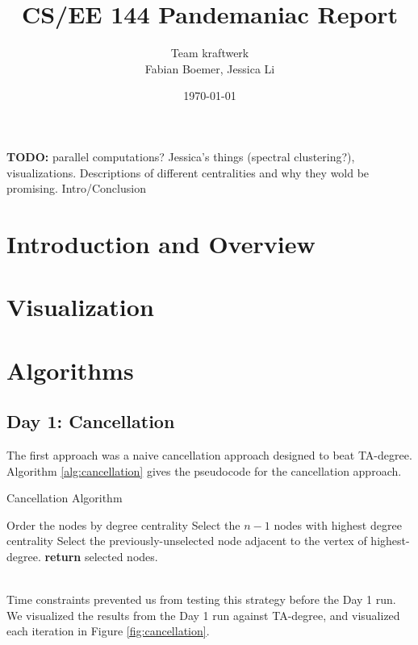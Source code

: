 \documentclass[letterpaper, 11pt]{article}
\begin{document}
\title{CS/EE 144 Pandemaniac Report}
\author{Team kraftwerk \\Fabian Boemer, Jessica Li}
\date{\today}
\maketitle


\textbf{TODO:}
parallel computations? Jessica's things (spectral clustering?), visualizations. Descriptions of different centralities and why they wold be promising. Intro/Conclusion

\section{Introduction and Overview}

\section{Visualization}

\section{Algorithms}
\subsection{Day 1: Cancellation}
The first approach was a naive cancellation approach designed to beat TA-degree. Algorithm \ref{alg:cancellation} gives the pseudocode for the cancellation approach.
\begin{algorithm}
\caption{Cancellation Algorithm}
\label{Cancellation}
\begin{algorithmic}[1]
\State Order the nodes by degree centrality
\State Select the $n-1$ nodes with highest degree centrality
\State Select the previously-unselected node adjacent to the vertex of highest-degree.
\State \textbf{return} selected nodes.
\EndProcedure
\end{algorithmic}
\label{alg:cancellation}
\end{algorithm} \\
Time constraints prevented us from testing this strategy before the Day 1 run. We visualized the results from the Day 1 run against TA-degree, and visualized each iteration in Figure \ref{fig:cancellation}.
\end{document}
